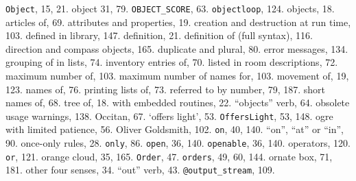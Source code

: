 {{{{{\tt Object}}, 15, 21.
object 31, 79.
{{\tt OBJECT\_SCORE}}, 63.
{{\tt objectloop}}, 124.
objects, 18.
\quad  articles of, 69.
\quad  attributes and properties, 19.
\quad  creation and destruction at run time, 103.
\quad  defined in library, 147.
\quad  definition, 21.
\quad  definition of (full syntax), 116.
\quad  direction and compass objects, 165.
\quad  duplicate and plural, 80.
\quad  error messages, 134.
\quad  grouping of in lists, 74.
\quad  inventory entries of, 70.
\quad  listed in room descriptions, 72.
\quad  maximum number of, 103.
\quad  maximum number of names for, 103.
\quad  movement of, 19, 123.
\quad  names of, 76.
\quad  printing lists of, 73.
\quad  referred to by number, 79, 187.
\quad  short names of, 68.
\quad  tree of, 18.
\quad  with embedded routines, 22.
``objects'' verb, 64.
obsolete usage warnings, 138.
Occitan, 67.
`offers light', 53.
{{\tt OffersLight}}, 53, 148.
ogre with limited patience, 56.
Oliver Goldsmith, 102.
{{\tt on}}, 40, 140.
``on'', ``at'' or ``in'', 90.
once-only rules, 28.
{{\tt only}}, 86.
{{\tt open}}, 36, 140.
{{\tt openable}}, 36, 140.
operators, 120.
{{\tt or}}, 121.
orange cloud, 35, 165.
{{\tt Order}}, 47.
{{\tt orders}}, 49, 60, 144.
ornate box, 71, 181.
other four senses, 34.
``out'' verb, 43.
{{\tt @output\_stream}}, 109.

}}}
